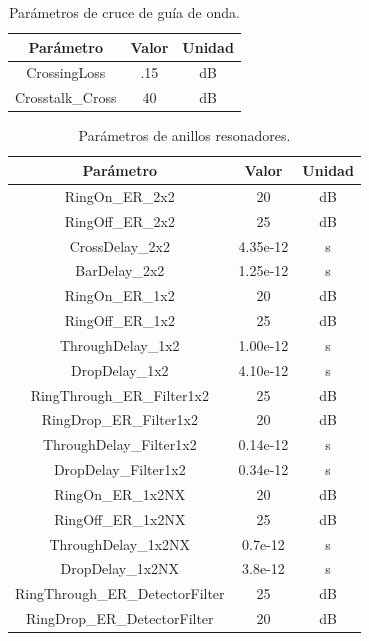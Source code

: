 \begin{table}[H]
\centering
\begin{tabular}{|c|c|c|}
\hline
Parámetro & Valor & Unidad \\ 
\hline
CrossingLoss & .15   & dB\\
Crosstalk\_Cross & 40 &dB\\
\hline
\end{tabular}
\caption{Parámetros de cruce de guía de onda. \cite{bogaerts2007low}}
\label{tb:phpar_wgc}
\end{table} 

\begin{table}[H]
\centering
\begin{tabular}{|c|c|c|}
\hline
Parámetro & Valor & Unidad \\ 
\hline
RingOn\_ER\_2x2 & 20 &dB\\
RingOff\_ER\_2x2 & 25 &dB\\
CrossDelay\_2x2 & 4.35e-12 &s\\
BarDelay\_2x2 & 1.25e-12   &s\\
\hline
RingOn\_ER\_1x2 & 20 &dB\\
RingOff\_ER\_1x2 & 25 &dB\\
ThroughDelay\_1x2 & 1.00e-12 &s\\
DropDelay\_1x2 & 4.10e-12 &s\\
\hline
RingThrough\_ER\_Filter1x2 & 25 &dB\\
RingDrop\_ER\_Filter1x2 & 20 &dB\\
ThroughDelay\_Filter1x2 & 0.14e-12 &s\\
DropDelay\_Filter1x2 & 0.34e-12 &s\\
\hline
RingOn\_ER\_1x2NX& 20 &dB\\
RingOff\_ER\_1x2NX & 25 &dB\\
ThroughDelay\_1x2NX & 0.7e-12 &s\\
DropDelay\_1x2NX & 3.8e-12 &s\\
\hline
RingThrough\_ER\_DetectorFilter & 25 &dB\\
RingDrop\_ER\_DetectorFilter & 20 &dB\\
\hline
\end{tabular}
\caption{Parámetros de anillos resonadores.}
\label{tb:phpar_rr}
\end{table} 




